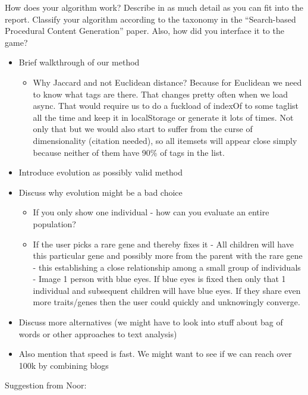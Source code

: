 \documentclass[]{article}
\begin{document}
\begin{framed}
How does your algorithm work? Describe in as much detail as you can fit into the report. Classify your algorithm according to the taxonomy in the “Search-based Procedural Content Generation” paper. Also, how did you interface it to the game?
\end{framed}



\begin{itemize}
\item Brief walkthrough of our method
	\begin{itemize}
	\item Why Jaccard and not Euclidean distance? Because for Euclidean we need to know what tags are there. That changes pretty often when we load async. That would require us to do a fuckload of indexOf to some taglist all the time and keep it in localStorage or generate it lots of times. Not only that but we would also start to suffer from the curse of dimensionality (citation needed), so all itemsets will appear close simply because neither of them have 90\% of tags in the list.
	\end{itemize}
\item Introduce evolution as possibly valid method
\item Discuss why evolution might be a bad choice
	\begin{itemize}
	\item If you only show one individual - how can you evaluate an entire population?
	\item If the user picks a rare gene and thereby fixes it - All children will have this particular gene and possibly more from the parent with the rare gene - this establishing a close relationship among a small group of individuals - Image 1 person with blue eyes. If blue eyes is fixed then only that 1 individual and subsequent children will have blue eyes. If they share even more traits/genes then the user could quickly and unknowingly converge.
	\end{itemize}
\item Discuss more alternatives (we might have to look into stuff about bag of words or other approaches to text analysis)
\item Also mention that speed is fast. We might want to see if we can reach over 100k by combining blogs
\end{itemize}
Suggestion from Noor:
\end{document}
